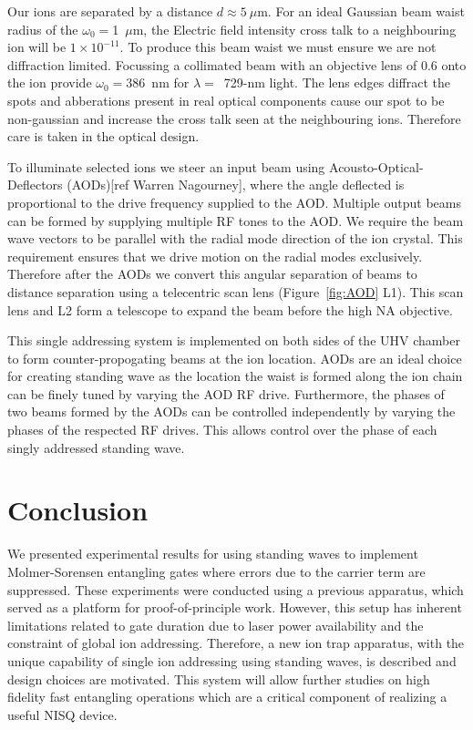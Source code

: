 \documentclass[12pt]{iopart}
\begin{document}
Our ions are separated by a distance $d\approx 5~\mu$m. For an ideal
Gaussian beam waist radius of the $\omega_0 = $1~$\mu$m, the Electric
field intensity cross talk to a neighbouring ion will be
$1\times 10^{-11}$. To produce this beam waist we must ensure we are not
diffraction limited.  Focussing a collimated beam with an objective
lens of 0.6 onto the ion provide $\omega_0 = 386$~nm for
$\lambda=$~729-nm light. The lens edges diffract the spots and
abberations present in real optical components cause our spot to be
non-gaussian and increase the cross talk seen at the neighbouring
ions. Therefore care is taken in the optical design.

To illuminate selected ions we steer an input beam using
Acousto-Optical-Deflectors (AODs)[ref Warren Nagourney], where the angle deflected is
proportional to the drive frequency supplied to the AOD. Multiple
output beams can be formed by supplying multiple RF tones to the AOD.
We require the beam wave vectors to be
parallel with the radial mode direction of the ion crystal. This
requirement ensures that we drive motion on the radial modes
exclusively. Therefore after the AODs we convert this angular
separation of beams to distance separation using a telecentric scan
lens (Figure~\ref{fig:AOD} L1).
This scan lens and L2 form a telescope to expand the beam before the
high NA objective.

This single addressing system is implemented on both sides of the UHV
chamber to form counter-propogating beams at the ion location. AODs are
an ideal choice for creating standing wave as the location the waist
is formed along the ion chain can be finely tuned by varying the AOD RF
drive. Furthermore, the phases of two beams formed by the AODs can be
controlled independently by varying the phases of the respected RF
drives. This allows control over the phase of each singly addressed
standing wave.\\


\section{Conclusion}
We presented experimental results for using standing waves to
implement Molmer-Sorensen entangling gates where errors due to the
carrier term are suppressed. These experiments were conducted using a
previous apparatus, which served as a platform for proof-of-principle
work. However, this setup has inherent limitations related to gate
duration due to laser power availability and the constraint of global
ion addressing.
Therefore, a new ion trap apparatus, with the unique capability of
single ion addressing using standing waves, is described and design
choices are motivated. This system will allow further studies on high
fidelity fast entangling operations which are a critical component of
realizing a useful NISQ device.
\end{document}
